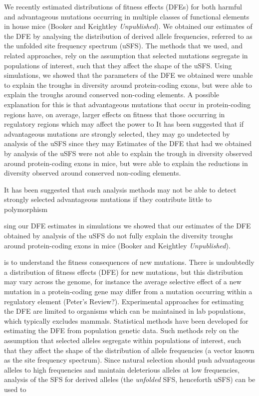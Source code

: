 \documentclass[11pt]{article}
\begin{document}
We recently estimated distributions of fitness effects (DFEs) for both harmful and advantageous mutations occurring in multiple classes of functional elements in house mice (Booker and Keightley \textit{Unpublished}). We obtained our estimates of the DFE by analysing the distribution of derived allele frequencies, referred to as the unfolded site frequency spectrum (uSFS). The methods that we used, and related approaches, rely on the assumption that selected mutations segregate in populations of interest, such that they affect the shape of the uSFS. Using simulations, we showed that the parameters of the DFE we obtained were unable to explain the troughs in diversity around protein-coding exons, but were able to explain the troughs around conserved non-coding elements. A possible explanation for this is that advantageous mutations that occur in protein-coding regions have, on average, larger effects on fitness that those occurring in regulatory regions which may affect the power to 
It has been suggested that if advantageous mutations are strongly selected, they may go undetected by analysis of the uSFS since they may 
 Estimates of the DFE that had we obtained by analysis of the uSFS were not able to explain the trough in diversity observed around protein-coding exons in mice, but were able to explain the reductions in diversity observed around conserved non-coding elements. 

It has been suggested that such analysis methods may not be able to detect strongly selected advantageous mutations if they contribute little to polymorphism

sing our DFE estimates in simulations we showed that our estimates of the DFE obtained by analysis of the uSFS do not fully explain the diversity troughs around protein-coding exons in mice (Booker and Keightley \textit{Unpublished}). 


 is to understand the fitness consequences of new mutations. There is undoubtedly a distribution of fitness effects (DFE) for new mutations, but this distribution may vary across the genome, for instance the average selective effect of a new mutation in a protein-coding gene may differ from a mutation occurring within a regulatory element (Peter's Review?). Experimental approaches for estimating the DFE are limited to organisms which can be maintained in lab populations, which typically excludes mammals. Statistical methods have been developed for estimating the DFE from population genetic data. Such methods rely on the assumption that selected alleles segregate within populations of interest, such that they affect the shape of the distribution of allele frequencies (a vector known as the site frequency spectrum). Since natural selection should push advantageous alleles to high frequencies and maintain deleterious alleles at low frequencies, analysis of the SFS for derived alleles (the \textit{unfolded} SFS, henceforth uSFS) can be used to 
\end{document}
